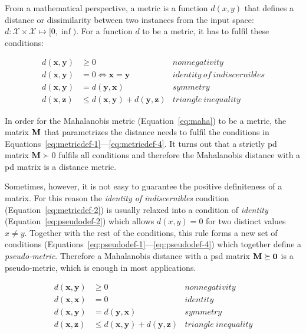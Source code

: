 \documentclass[12pt,a4paper]{report}
\begin{document}
From a mathematical perspective, a metric is a function $d(x,y)$ that defines a distance or dissimilarity between two instances from the input space: $d:\mathcal{X} \times \mathcal{X} \mapsto [0,\inf)$. For a function $d$ to be a metric, it has to fulfil these conditions:

\begin{align}
d(\textbf{x},\textbf{y}) &\geq 0 & nonnegativity \label{eq:metricdef-1} \\
d(\textbf{x},\textbf{y}) &= 0 \iff \textbf{x}=\textbf{y} & identity \ of \ indiscernibles \label{eq:metricdef-2} \\
d(\textbf{x},\textbf{y}) &= d(\textbf{y},\textbf{x}) & symmetry \label{eq:metricdef-3} \\
d(\textbf{x},\textbf{z}) &\leq d(\textbf{x},\textbf{y}) + d(\textbf{y},\textbf{z}) & triangle \ inequality \label{eq:metricdef-4}
\end{align} 

In order for the Mahalanobis metric (Equation~\ref{eq:maha}) to be a metric, the matrix $\bf{M}$ that parametrizes the distance needs to fulfil the conditions in Equations~\ref{eq:metricdef-1}---\ref{eq:metricdef-4}. It turns out that a strictly \ac{pd} matrix $\bm{M} \succ 0$ fulfils all conditions and therefore the Mahalanobis distance with a \ac{pd} matrix is a distance metric.

Sometimes, however, it is not easy to guarantee the positive definiteness of a matrix. For this reason the \textit{identity of indiscernibles} condition (Equation~\ref{eq:metricdef-2}) is usually relaxed into a condition of \textit{identity} (Equation~\ref{eq:pseudodef-2}) which allows $d(x,y)=0$ for two distinct values $x \neq y$. Together with the rest of the conditions, this rule forms a new set of conditions (Equations~\ref{eq:pseudodef-1}---\ref{eq:pseudodef-4}) which together define a \textit{pseudo-metric}. Therefore a Mahalanobis distance with a \ac{psd} matrix $\bf{M} \succeq 0$ is a pseudo-metric, which is enough in most applications.

\begin{align}
d(\textbf{x},\textbf{y}) &\geq 0 & nonnegativity \label{eq:pseudodef-1} \\
d(\textbf{x},\textbf{x}) &= 0 & identity \label{eq:pseudodef-2} \\
d(\textbf{x},\textbf{y}) &= d(\textbf{y},\textbf{x}) & symmetry \label{eq:pseudodef-3} \\
d(\textbf{x},\textbf{z}) &\leq d(\textbf{x},\textbf{y}) + d(\textbf{y},\textbf{z}) & triangle \ inequality \label{eq:pseudodef-4}
\end{align} 
\end{document}
